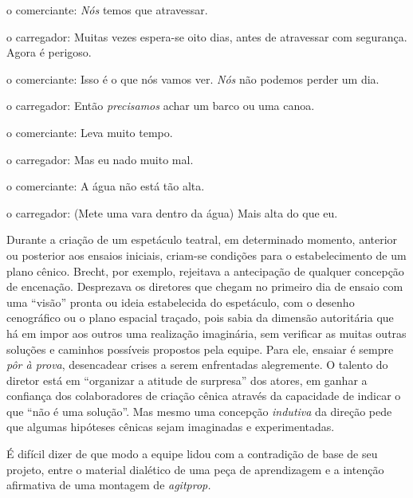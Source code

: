 {\sc o comerciante}: {\it Nós} temos que atravessar.

{\sc o carregador}: Muitas vezes espera-se oito dias, antes de atravessar com
segurança. Agora é perigoso.

{\sc o comerciante}: Isso é o que nós vamos ver. {\it Nós} não podemos perder
um dia.

{\sc o carregador}: Então {\it precisamos} achar um barco ou uma canoa.

{\sc o comerciante}: Leva muito tempo.

{\sc o carregador}: Mas eu nado muito mal.

{\sc o comerciante}: A água não está tão alta.

{\sc o carregador}: (Mete uma vara dentro da água) Mais alta do que eu.

\stopblockquote


\subject{Concepção em processo: a sala como tribuna}

Durante a criação de um espetáculo teatral, em determinado momento,
anterior ou posterior aos ensaios iniciais, criam-se condições para o
estabelecimento de um plano cênico. Brecht, por exemplo, rejeitava a
antecipação de qualquer concepção de encenação. Desprezava os
diretores
que chegam no primeiro dia de ensaio com uma “visão” pronta ou ideia
estabelecida do espetáculo, com o desenho cenográfico ou o plano
espacial traçado, pois sabia da dimensão autoritária que há em impor aos
outros uma realização imaginária, sem verificar as muitas outras
soluções e caminhos possíveis propostos pela equipe. Para ele, ensaiar é
sempre {\it pôr à prova}, desencadear crises a serem enfrentadas
alegremente. O talento do diretor está em “organizar a atitude de
surpresa” dos atores, em ganhar a confiança dos colaboradores de criação
cênica através da capacidade de indicar o que “não é uma solução”. Mas
mesmo uma concepção {\it indutiva} da direção pede que algumas hipóteses
cênicas sejam imaginadas e experimentadas.

É difícil dizer de que modo a equipe lidou com a contradição de base de
seu projeto, entre o material dialético de uma peça de
aprendizagem e a intenção afirmativa de uma montagem de {\it agitprop.}

